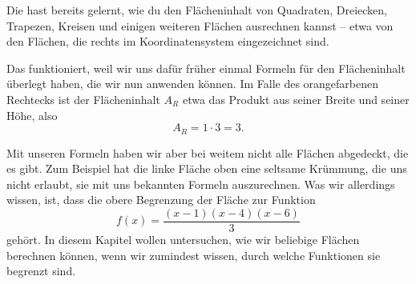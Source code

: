 \documentclass[../../main.tex]{subfiles}
\begin{document}

Die hast bereits gelernt, wie du den Flächeninhalt von Quadraten, Dreiecken, Trapezen, Kreisen und einigen weiteren
Flächen ausrechnen kannst -- etwa von den Flächen, die rechts im Koordinatensystem eingezeichnet sind.

Das funktioniert, weil wir uns dafür früher einmal Formeln für den Flächeninhalt überlegt haben, die wir nun anwenden 
können. Im Falle des orangefarbenen Rechtecks ist der Flächeninhalt $A_R$ etwa das Produkt aus seiner Breite und seiner
Höhe, also
\[A_R=1\cdot 3=3.\]

Mit unseren Formeln haben wir aber bei weitem nicht alle Flächen abgedeckt, die es gibt. Zum Beispiel hat die linke
Fläche oben eine seltsame Krümmung, die uns nicht erlaubt, sie mit uns bekannten Formeln auszurechnen. Was wir allerdings
wissen, ist, dass die obere Begrenzung der Fläche zur Funktion
\[f(x)=\frac{(x-1)(x-4)(x-6)}{3}\] 
gehört. In diesem Kapitel wollen untersuchen, wie wir beliebige Flächen berechnen können, wenn wir zumindest wissen,
durch welche Funktionen sie begrenzt sind.
\end{document}
